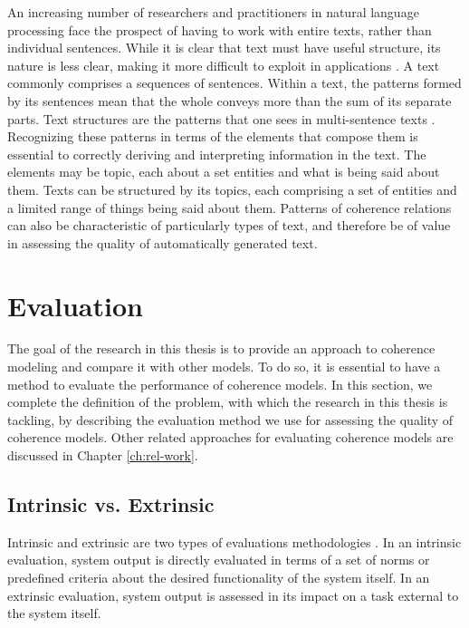 An increasing number of researchers and practitioners in natural language processing face the prospect of having to work with entire texts, rather than individual sentences. 
While it is clear that text must have useful structure, its nature is less clear, making it more difficult to exploit in applications \cite{webber12a}. 
A text commonly comprises a sequences of sentences. 
Within a text, the patterns formed by its sentences mean that the whole conveys more than the sum of its separate parts. 
Text structures are the patterns that one sees in multi-sentence texts \cite{webber12a}. 
Recognizing these patterns in terms of the elements that compose them is essential to correctly deriving and interpreting information in the text. 
The elements may be topic, each  about a set entities and what is being said about them.
Texts can be structured by its topics, each comprising a set of entities and a limited range of things being said about them. 
Patterns of coherence relations can also be characteristic of particularly types of text, and therefore be of value in assessing the quality of automatically generated text. 

\section{Evaluation}
\label{sec:coh-eval}

The goal of the research in this thesis is to provide an approach to coherence modeling and compare it with other models. 
To do so, it is essential to have a method to evaluate the performance of coherence models. 
In this section, we complete the definition of the problem, with which the research in this thesis is tackling, by describing the evaluation method we use for assessing the quality of coherence models. 
Other related approaches for evaluating coherence models are discussed in Chapter \ref{ch:rel-work}. 

\subsection{Intrinsic vs. Extrinsic}

Intrinsic and extrinsic are two types of evaluations methodologies \cite{}. 
In an intrinsic evaluation, system output is directly evaluated in terms of a set of norms or predefined criteria about the desired functionality of the system itself. 
In an extrinsic evaluation, system output is assessed in its impact on a task external to the system itself. 

